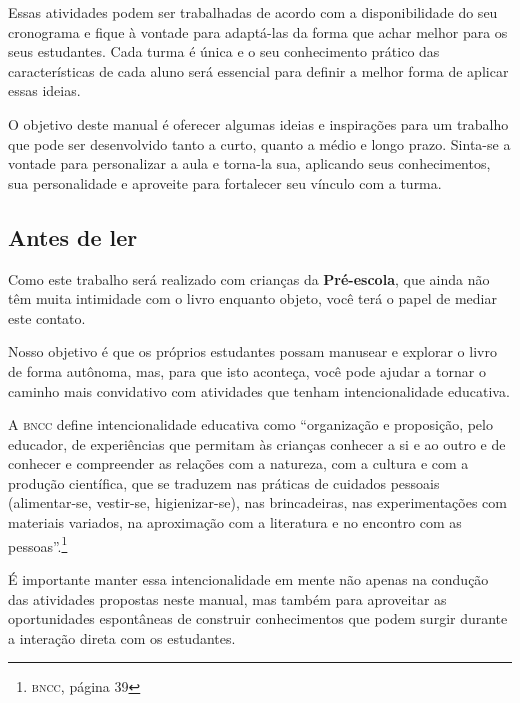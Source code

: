 \documentclass[11pt]{extarticle}
\begin{document}
Essas atividades podem ser trabalhadas de acordo com a 
disponibilidade do seu cronograma e fique à vontade para adaptá-las 
da forma que achar melhor para os seus estudantes. Cada turma é única 
e o seu conhecimento prático das características de cada aluno será 
essencial para definir a melhor forma de aplicar essas ideias. 

O objetivo deste manual é oferecer algumas ideias 
e inspirações para um trabalho que pode ser desenvolvido tanto 
a curto, quanto a médio e longo prazo. Sinta-se a vontade para 
personalizar a aula e torna-la sua, aplicando seus conhecimentos, sua 
personalidade e aproveite para fortalecer 
seu vínculo com a turma.


\subsection{Antes de ler}


Como este trabalho será realizado com crianças da \textbf{Pré-escola}, 
que ainda não têm muita intimidade com o livro enquanto objeto, você terá o 
papel de mediar este contato. 

Nosso objetivo é que os próprios estudantes possam manusear 
e explorar o livro de forma autônoma, mas, para que isto aconteça, você 
pode ajudar a tornar o caminho mais convidativo com atividades que tenham 
intencionalidade educativa. 

A \textsc{bncc} define intencionalidade educativa como ``organização 
e proposição, pelo educador, de experiências que permitam às crianças 
conhecer a si e ao outro e de conhecer e compreender as relações com a 
natureza, com a cultura e com a produção científica, que se traduzem nas 
práticas de cuidados pessoais (alimentar-se, vestir-se, higienizar-se), 
nas brincadeiras, nas experimentações com materiais 
variados, na aproximação com a literatura e no encontro com as 
pessoas''.\footnote{\textsc{bncc}, página 39}

É importante manter essa intencionalidade em mente não apenas na condução 
das atividades propostas neste manual, mas também para aproveitar as 
oportunidades espontâneas de construir conhecimentos que podem surgir durante 
a interação direta com os estudantes.
\end{document}
